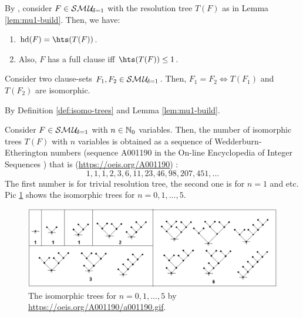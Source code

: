 \documentclass{report}
\begin{document}
\begin{lem}\label{lem:smu1hs1}
By \cite{GwynneKullmann2013GoodRepresentations}, consider $F \in \mathcal{S}\mathcal{M\hspace{0.8pt}U}_{\!\delta=1}$ with the resolution tree $T(F)$ as in Lemma \ref{lem:mu1-build}. Then, we have:
  \begin{enumerate}
  \item $\hardness(F) = \hts(T(F))$.
  \item Also, $F$ has a full clause iff $\hts(T(F)) \le 1$.
  \end{enumerate}
\end{lem}

\begin{lem}\label{lem:mu1-iso}
Consider two clause-sets $F_1,F_2 \in \mathcal{S}\mathcal{M\hspace{0.8pt}U}_{\!\delta=1}$. Then, $F_1=F_2 \iff T(F_1) $ and $T(F_2)$ are isomorphic.
\end{lem}    
\begin{prf}
By Definition \ref{def:isomo-trees} and Lemma \ref{lem:mu1-build}.
\end{prf}                                                                                                     
                                                                                                                                                                                                                                           
\begin{lem}\label{lem:mu1-iso-num}
Consider $F \in \mathcal{S}\mathcal{M\hspace{0.8pt}U}_{\!\delta=1}$ with $n \in \mathbb{N}_0$ variables. Then, the number of isomorphic trees $T(F)$ with $n$ variables is obtained as a sequence of Wedderburn-Etherington numbers (sequence A001190 in the On-line Encyclopedia of Integer Sequences \cite{Sloane2008OEIS}) that is (\url{https://oeis.org/A001190}) :
\begin{displaymath}
 1, 1, 1, 2, 3, 6, 11, 23, 46, 98, 207, 451, ...
\end{displaymath}
The first number is for trivial resolution tree, the second one is for $n=1$ and etc. Pic \ref{fig:isotree} shows the isomorphic trees for $n=0,1,..., 5$.
 \begin{figure}
   \begin{center}
   \includegraphics[scale =0.45]{a001190.png}
   \caption{The isomorphic trees for $n=0,1,..., 5$ by \url{https://oeis.org/A001190/a001190.gif}.}
   \label{fig:isotree}
   \end{center}
   \end{figure}
\end{lem}   
                             
\end{document}
